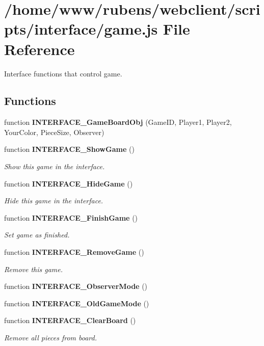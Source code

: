 \section{/home/www/rubens/webclient/scripts/interface/game.js File Reference}
\label{interface_2game_8js}
Interface functions that control game. 

\subsection*{Functions}
\begin{CompactItemize}
\item 
function {\bf INTERFACE\_\-GameBoardObj} (GameID, Player1, Player2, YourColor, PieceSize, Observer)
\item 
function {\bf INTERFACE\_\-ShowGame} ()
\begin{CompactList}\small\item\em Show this game in the interface. \item\end{CompactList}\item 
function {\bf INTERFACE\_\-HideGame} ()
\begin{CompactList}\small\item\em Hide this game in the interface. \item\end{CompactList}\item 
function {\bf INTERFACE\_\-FinishGame} ()
\begin{CompactList}\small\item\em Set game as finished. \item\end{CompactList}\item 
function {\bf INTERFACE\_\-RemoveGame} ()
\begin{CompactList}\small\item\em Remove this game. \item\end{CompactList}\item 
function {\bf INTERFACE\_\-ObserverMode} ()
\item 
function {\bf INTERFACE\_\-OldGameMode} ()
\item 
function {\bf INTERFACE\_\-ClearBoard} ()
\begin{CompactList}\small\item\em Remove all pieces from board. \item\end{CompactList}\item 

\end{CompactItemize}
